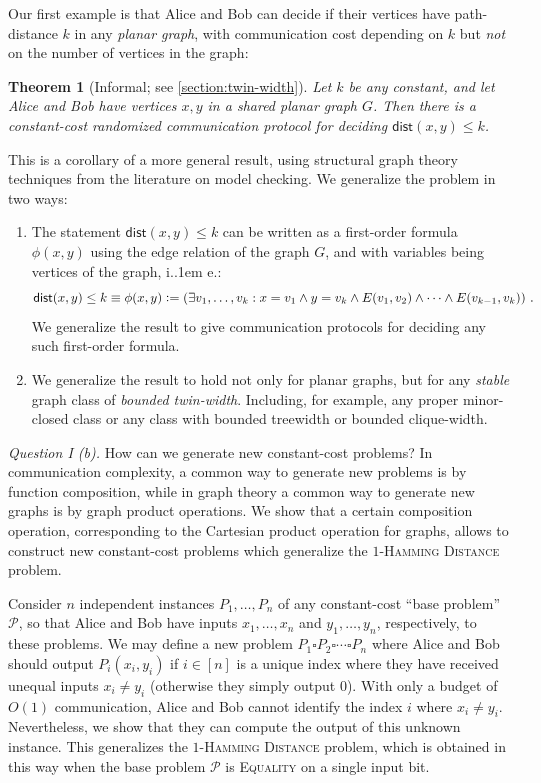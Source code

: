 \documentclass{article}
\makeatletter
\newtheorem{theorem}{Theorem}\newtheorem{lemma}[theorem]{Lemma}\newtheorem{proposition}[theorem]{Proposition}\newtheorem{corollary}[theorem]{Corollary}\newtheorem{definition}[theorem]{Definition}\newtheorem{claim}[theorem]{Claim}\newtheorem{remark}[theorem]{Remark}\newtheorem{observation}[theorem]{Observation}\newtheorem{conjecture}[theorem]{Conjecture}\newtheorem{example}[theorem]{Example}
\newcommand{\dist}{\mathsf{dist}}
\newcommand{\define}{\vcentcolon=}
\newcommand{\cP}{\ensuremath{\mathcal{P}}}
\newcommand*\ie{i.\kern.1em e.\@\xspace} %
\makeatother
\begin{document}
Our first example is that Alice and Bob can decide if their vertices have path-distance $k$ in any
\emph{planar graph}, with communication cost depending on $k$ but \emph{not} on the number of
vertices in the graph:

\begin{theorem}[Informal; see \cref{section:twin-width}]
\label{thm:intro-planar}
Let $k$ be any constant, and let Alice and Bob have vertices $x,y$ in a shared planar graph $G$.
Then there is a constant-cost randomized communication protocol for deciding $\dist(x,y) \leq k$.
\end{theorem}

This is a corollary of a more general result, using structural graph theory techniques from the
literature on model checking. We generalize the problem in two ways:
\begin{enumerate}
\item The statement $\dist(x,y) \leq k$ can be written as a
first-order formula $\phi(x,y)$ using the edge relation of the graph $G$, and with variables being
vertices of the graph, \ie:
\[
  \dist(x,y) \leq k \equiv \phi(x,y) \define \left( \exists v_1, \dotsc, v_k : x=v_1 \wedge y = v_k
\wedge E(v_1, v_2) \wedge \dotsm \wedge E(v_{k-1}, v_k) \right) \,.
\]
We generalize the result to give communication protocols for deciding any
such first-order formula.
\item We generalize the result to hold not only for planar graphs, but for any \emph{stable} graph
class of \emph{bounded twin-width}. Including, for example, any proper minor-closed class or any
class with bounded treewidth or bounded clique-width.
\end{enumerate}

\noindent
\emph{Question I (b).}
How can we generate new constant-cost problems? In communication complexity, a common way to
generate new problems is by function composition, while in graph theory a common way to generate new
graphs is by graph product operations. We show that a certain composition operation, corresponding
to the Cartesian product operation for graphs, allows to construct new constant-cost problems 
which generalize the \textsc{$1$-Hamming Distance} problem.

Consider $n$ independent instances $P_1, \dotsc, P_n$ of any constant-cost ``base problem''
$\cP$, so that Alice and Bob have inputs $x_1, \dotsc, x_n$ and $y_1, \dotsc, y_n$, respectively, to
these problems. We may define a new problem $P_1 \square P_2 \square \dotsm \square P_n$ where Alice
and Bob should output $P_i(x_i, y_i)$ if $i \in [n]$ is a unique index where they have received
unequal inputs $x_i \neq y_i$ (otherwise they simply output 0).  With only a budget of $O(1)$
communication, Alice and Bob cannot identify the index $i$ where $x_i \neq y_i$.  Nevertheless, we
show that they can compute the output of this unknown instance. This generalizes the
\textsc{$1$-Hamming Distance} problem, which is obtained in this way when the base problem $\cP$
is \textsc{Equality} on a single input bit.
\end{document}
